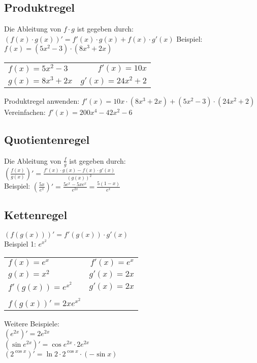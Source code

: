 \documentclass[a4paper, 11pt]{article}
\begin{document}
\subsection{Produktregel}
Die Ableitung von $f \cdot g$ ist gegeben durch: \newline
\newline $(f(x) \cdot g(x))' = f'(x) \cdot g(x) + f(x) \cdot g'(x)$\newline
\newline Beispiel: $f(x) = (5x^2 - 3) \cdot (8x^3+2x)$

\begin{tabular}{l r}
	$f(x) = 5x^2 - 3$ & $f'(x) = 10x$\\
	$g(x)=8x^3+2x$ & $g'(x)=24x^2 + 2$\\
\end{tabular} \newline
\newline Produktregel anwenden: 
\newline $f'(x)=10x \cdot (8x^3+2x) + (5x^2-3) \cdot (24x^2+2)$ \newline
\newline Vereinfachen: $f'(x) = 200x^4-42x^2-6$

\subsection{Quotientenregel}

Die Ableitung von $\frac{f}{g}$ ist gegeben durch: \\
\newline $(\frac{f(x)}{g(x)})' = \frac{f'(x) \cdot g(x) - f(x) \cdot
g'(x)}{(g(x))^2}$ \\

Beispiel: $(\frac{5x}{e^x})' = \frac{5e^x-5xe^x}{e^{2x}} = \frac{5(1-x)}{e^x}$

\subsection{Kettenregel}

$(f(g(x)))' = f'(g(x)) \cdot g'(x)$\\
\newline Beispiel 1: $e^{x^{2}}$\\ 
\begin{tabular}{l r}
	$f(x)=e^x$ & $f'(x)=e^x$\\
	$g(x)=x^2$ & $g'(x)=2x$\\
	$f'(g(x))=e^{x^{2}}$ & $g'(x)=2x$\\
	& \\
	$f(g(x))'=2xe^{x^{2}}$
\end{tabular} \newline
\newline Weitere Beispiele: \\
$(e^{2x})' = 2e^{2x}$\\
$(\sin{e^{2x}})' = \cos{e^{2x}} \cdot 2e^{2x}$\\
$(2^{\cos{x}})'=\ln{2} \cdot 2^{\cos{x}} \cdot (-\sin{x})$
\end{document}
